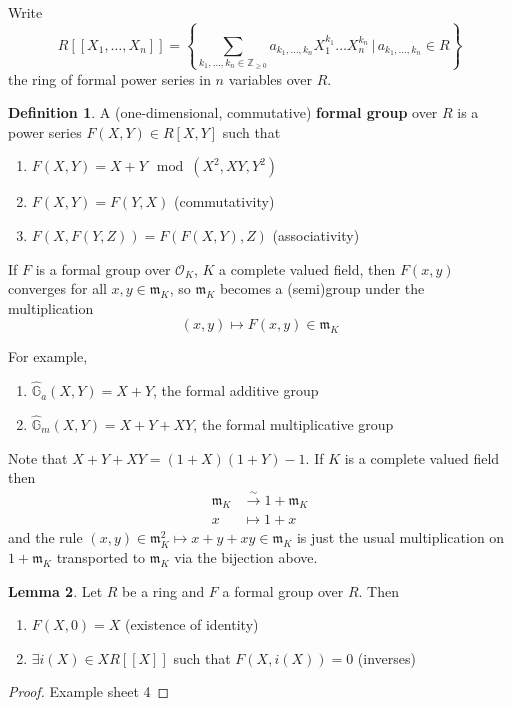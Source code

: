 \documentclass[a4paper]{article}
\theoremstyle{definition}
\newtheorem{definition}{Definition}
\theoremstyle{default}
\newtheorem{lemma}[definition]{Lemma}
\theoremstyle{remark}
\begin{document}
Write $$R[[X_1,\dots,X_n]] = \left\{\sum_{k_1,\dots,k_n \in \mathbb{Z}_{\geq 0}} a_{k_1, \dots, k_n}X_1^{k_1}\dots X_n^{k_n} \,|\, a_{k_1, \dots, k_n} \in R \right\}$$
the ring of formal power series in $n$ variables over $R$.

\begin{definition}
	A (one-dimensional, commutative) \textbf{formal group} over $R$ is a power series $F(X, Y) \in R[X, Y]$ such that
	\begin{enumerate}
		\item $F(X, Y) = X+Y \mod (X^2, XY, Y^2)$
		\item $F(X,Y) = F(Y, X)$ (commutativity)
		\item $F(X, F(Y,Z)) = F(F(X,Y), Z)$ (associativity)
	\end{enumerate}
\end{definition}

If $F$ is a formal group over $\mathcal{O}_K$,
$K$ a complete valued field,
then $F(x, y)$ converges for all $x, y \in \mathfrak{m}_K$,
so $\mathfrak{m}_K$ becomes a (semi)group under the multiplication
$$(x, y) \mapsto F(x, y) \in \mathfrak{m}_K$$

For example,
\begin{enumerate}
	\item $\hat{\mathbb{G}}_a(X,Y) = X + Y$, the formal additive group
	\item $\hat{\mathbb{G}}_m(X,Y) = X+Y+XY$, the formal multiplicative group
\end{enumerate}
Note that $X+Y+XY = (1+X)(1+Y)-1$.
If $K$ is a complete valued field then
\begin{align*}
	\mathfrak{m}_K & \overset{\sim}{\longrightarrow} 1+ \mathfrak{m}_K \\
	x &\mapsto 1+x
\end{align*}
and the rule $(x, y) \in \mathfrak{m}_K^2 \mapsto x+y+xy \in \mathfrak{m}_K$ is just the usual multiplication
on $1+\mathfrak{m}_K$ transported to $\mathfrak{m}_K$ via the bijection above.

\begin{lemma}
	Let $R$ be a ring and $F$ a formal group over $R$.
	Then
	\begin{enumerate}
		\item $F(X, 0) = X$ (existence of identity)
		\item $\exists i(X) \in XR[[X]]$ such that $F(X, i(X)) = 0$ (inverses)
	\end{enumerate}
\end{lemma}
\begin{proof}
	Example sheet 4
\end{proof}
\end{document}
